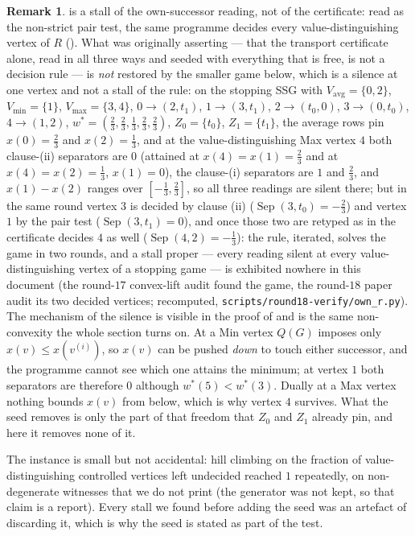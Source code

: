 \documentclass[11pt]{article}
\theoremstyle{plain}
\theoremstyle{definition}
\newtheorem{remark}[theorem]{Remark}
\newcommand{\Vmax}{V_{\max}}
\newcommand{\Vmin}{V_{\min}}
\newcommand{\Vavg}{V_{\mathrm{avg}}}
\begin{document}
\begin{remark}\label{rem:own-stall}
 is a stall of the own-successor reading, not of the
certificate: read as the non-strict pair test, the same programme decides
every value-distinguishing vertex of $R$ (). What
 was originally asserting --- that the transport
certificate alone, read in all three ways and seeded with everything that is
free, is not a decision rule --- is \emph{not} restored by the smaller game
below, which is a silence at one vertex and not a stall of the rule: on the
stopping SSG with $\Vavg=\{0,2\}$, $\Vmin=\{1\}$, $\Vmax=\{3,4\}$,
$0\to(2,t_1)$, $1\to(3,t_1)$, $2\to(t_0,0)$, $3\to(0,t_0)$, $4\to(1,2)$,
$w^\ast=(\tfrac23,\tfrac23,\tfrac13,\tfrac23,\tfrac23)$, $Z_0=\{t_0\}$,
$Z_1=\{t_1\}$, the average rows pin $x(0)=\tfrac23$ and $x(2)=\tfrac13$, and
at the value-distinguishing Max vertex $4$ both clause-(ii) separators
are $0$ (attained at $x(4)=x(1)=\tfrac23$ and at $x(4)=x(2)=\tfrac13$,
$x(1)=0$), the clause-(i) separators are $1$ and $\tfrac23$, and $x(1)-x(2)$
ranges over $[-\tfrac13,\tfrac23]$, so all three readings are silent there;
but in the same round vertex $3$ is decided by clause (ii)
($\operatorname{Sep}(3,t_0)=-\tfrac23$) and vertex $1$ by the pair test
($\operatorname{Sep}(3,t_1)=0$), and once those two are retyped as in
 the certificate decides $4$ as well
($\operatorname{Sep}(4,2)=-\tfrac13$): the rule, iterated, solves the game
in two rounds, and a stall proper --- every reading silent at every
value-distinguishing vertex of a stopping game --- is exhibited nowhere in
this document (the round-$17$ convex-lift audit found the game, the
round-$18$ paper audit its two decided vertices; recomputed,
\texttt{scripts/round18-verify/own\_r.py}). The mechanism of the silence is visible
in the proof of  and is the same
non-convexity the whole section turns on. At a Min vertex $Q(G)$ imposes only
$x(v)\le x(v^{(i)})$, so $x(v)$ can be pushed \emph{down} to touch either
successor, and the programme cannot see which one attains the minimum; at
vertex $1$ both separators are therefore $0$ although $w^\ast(5)<w^\ast(3)$.
Dually at a Max vertex nothing bounds $x(v)$ from below, which is why vertex
$4$ survives. What the seed removes is only the part of that freedom that
$Z_0$ and $Z_1$ already pin, and here it removes none of it.

The instance is small but not accidental: hill climbing on the fraction of
value-distinguishing controlled vertices left undecided reached $1$
repeatedly, on non-degenerate witnesses that we do not print (the
generator was not kept, so that claim is a report). Every stall we found
before adding the seed was an artefact of discarding it, which is why the
seed is stated as part of the test.
\end{remark}
\end{document}
